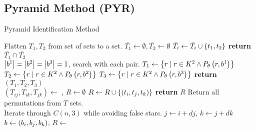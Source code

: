 \subsection{Pyramid Method (PYR)}\label{subsec:pyramidMethod}
\begin{algorithm}
    \caption{Pyramid Identification Method} \label{algorithm:pyramidIdentification}
    \begin{algorithmic}[1]
        \LineComment Flatten $T_1, T_2$ from set of sets to a set.
        \State $\bar{T_1} \gets \emptyset, \bar{T_2} \gets \emptyset$
        \State $\bar{T_i} \gets \bar{T_i} \cup \left\{  t_1, t_2  \right\}$
        \EndFor
        \EndFor
        \State \textbf{return} $\bar{T_1} \cap \bar{T_2}$
        \EndFunction
        \\
        \LineComment $\left| b^1 \right| = \left| b^2 \right| = \left| b^3 \right| = 1$, search with each pair.
        \State $T_1 \gets \left\{  r \mid r \in K^2 \land P_\theta \left(r, b^1\right)  \right\}$
        \State $T_2 \gets \left\{  r \mid r \in K^2 \land P_\theta \left(r, b^2\right)  \right\}$
        \State $T_3 \gets \left\{  r \mid r \in K^2 \land P_\theta \left(r, b^3\right)  \right\}$
        \State \textbf{return}{$\left( T_1, T_2, T_3 \right)$}
        \EndFunction
        \\
        \State $(T_{ij}, T_{ik}, T_{jk}) \gets$ , $R \gets \emptyset$
        \State $R \gets R \cup \left\{  \left(t_i, t_j, t_k\right)  \right\}$
        \EndFor
        \EndFor
        \EndFor
        \State \textbf{return} $R$ \Comment Return all permutations from $T$ sets.
        \EndFunction
        \\
        \LineComment Iterate through $C(n, 3)$ while avoiding false stars.
        \For{$dj \gets 1 \text{\textbf{ to }} n - 2$}
        \State $j \gets i + dj$, $k \gets j + dk$
        \State $b \gets \left(b_i, b_j, b_k\right)$, $R \gets $

\end{algorithmic}
\end{algorithm}
